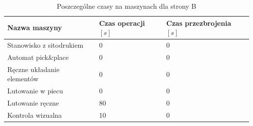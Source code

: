 \begin{table}[H]
	\centering
	\caption{Poszczególne czasy na maszynach dla strony B}
	\begin{tabular}{lll}
		\toprule
		Nazwa maszyny                 & Czas operacji $[s]$ & Czas przezbrojenia $[s]$ \\
		\midrule
		Stanowisko z sitodrukiem      & 0                   & 0                        \\
		Automat pick\&place           & 0                   & 0                        \\
		Ręczne układanie elementów & 0                   & 0                        \\
		Lutowanie w piecu             & 0                   & 0                        \\
		Lutowanie ręczne             & 80                  & 0                        \\
		Kontrola wizualna             & 10                  & 0                        \\
		\bottomrule
	\end{tabular}
\end{table}

